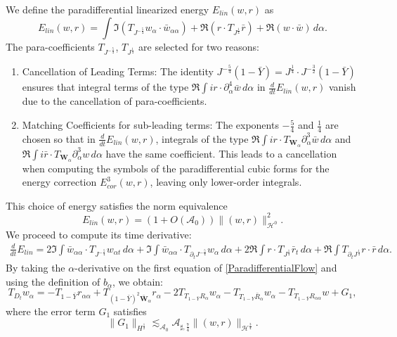 \documentclass[10pt]{amsart}
\theoremstyle{remark}
\theoremstyle{definition}
\numberwithin{equation}{section}
\newcommand{\p}{\partial}
\renewcommand{\H}{{\mathcal H }}
\newcommand{\al}{\alpha}
\newcommand{\f}{\frac}
\newcommand{\bw}{\mathbf{W}}
\newcommand{\CalAZ}{{\mathcal{A}_0}}
\begin{document}
We define the paradifferential linearized energy $E_{lin}(w,r)$ as
\begin{equation} \label{ElinDef}
    E_{lin}(w,r) = \int \Im \left(T_{J^{-\f54}}w_{\al}\cdot \bar{w}_{\al \al} \right) + \Re \left(r\cdot T_{J^{\f14}}\bar{r}\right) + \Re(w\cdot \bar{w})\,d\alpha.
\end{equation}
The para-coefficients $T_{J^{-\f54}}$, $T_{J^{\f14}}$ are selected for two reasons:
\begin{enumerate}
\item Cancellation of Leading Terms: The identity $J^{-\f54}(1-\bar{Y}) = J^\f14\cdot J^{-\f32}(1-\bar{Y})$ ensures that integral terms of the type $\Re \int ir \cdot \partial_\al^4 \bar{w}\,d\al$ in $\f{d}{dt}E_{lin}(w,r)$ vanish due to the cancellation of para-coefficients.
\item Matching Coefficients for sub-leading terms: The exponents $-\f54$ and $\f14$ are chosen so that in $\f{d}{dt}E_{lin}(w,r)$, integrals of the type $\Re \int ir \cdot T_{\bw_\al} \p_\al^3 \bar{w} \,d\al$ and $\Re \int i\bar{r} \cdot T_{\bw_\al}\p_\al^3 w \,d\al$ have the same coefficient. This leads to a cancellation when computing the symbols of the paradifferential cubic forms for the energy correction $E^3_{cor}(w,r)$, leaving only lower-order integrals.
\end{enumerate}

This choice of energy satisfies the norm equivalence
\begin{equation*}
  E_{lin}(w,r) =  (1+O(\CalAZ)) \|(w,r)\|_{\H^0}^2. 
\end{equation*}
We proceed to compute its time derivative:
\begin{align*}
\frac{d}{dt} E_{lin} =  2\Im \int \bar{w}_{\al \al} \cdot T_{J^{-\f54}}w_{\al t} \,d\alpha  +\Im \int \bar{w}_{\al \al} \cdot T_{\partial_tJ^{-\f54}}w_{\al} \,d\alpha + 2\Re \int r\cdot T_{J^{\f14}}\bar{r}_t \, d\alpha  + \Re \int T_{\partial_t J^{\f14}}r\cdot \bar{r}\,d\alpha.
\end{align*} 
By taking the $\alpha$-derivative on the first equation of \eqref{ParadifferentialFlow} and using the definition of $b_\al$, we obtain:
\begin{equation} \label{wAlphaParaMat}
T_{D_t}w_\al = -T_{1-\bar{Y}}r_{\al\al} + T_{(1-\bar{Y})^2\bar{\bw}_\al}r_\al - 2T_{T_{1-\bar{Y}}R_{\al}}w_\al - T_{T_{1-Y}\bar{R}_\al}w_\al - T_{T_{1-\bar{Y}}R_{\al\al}}w + G_1,
\end{equation}
where the error term $G_1$ satisfies
\begin{equation*}
\|G_1\|_{H^\f12} \lesssim_{\CalAZ} \mathcal{A}_{\sharp, \f74}  \| (w,r)\|_{\mathcal{H}^{\f34}}.
\end{equation*}
\end{document}
